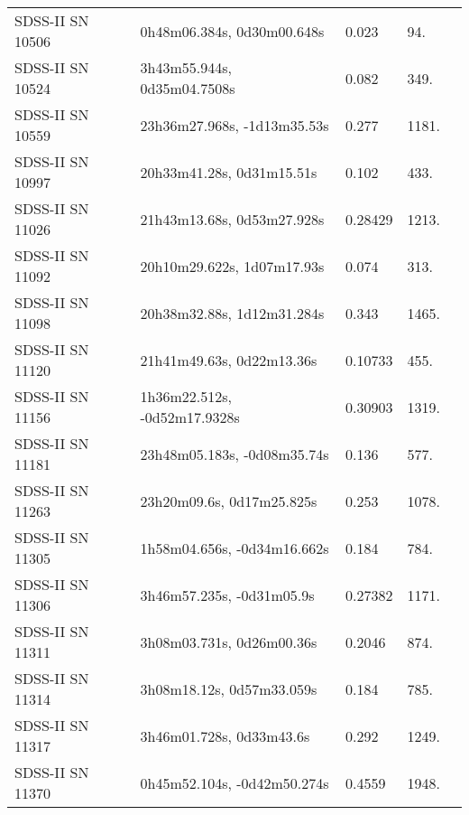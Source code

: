 \begin{longtable}{lllll}
 SDSS-II SN 10506 &     0h48m06.384s, 0d30m00.648s &    0.023 &            94. &    \citet{2011ApJ...738..162S} \\
 SDSS-II SN 10524 &    3h43m55.944s, 0d35m04.7508s &    0.082 &           349. &    \citet{2011ApJ...738..162S} \\
 SDSS-II SN 10559 &    23h36m27.968s, -1d13m35.53s &    0.277 &          1181. &    \citet{2011ApJ...738..162S} \\
 SDSS-II SN 10997 &      20h33m41.28s, 0d31m15.51s &    0.102 &           433. &    \citet{2011ApJ...738..162S} \\
 SDSS-II SN 11026 &     21h43m13.68s, 0d53m27.928s &  0.28429 &          1213. &    \citet{2016SDSSD.C...0000:} \\
 SDSS-II SN 11092 &     20h10m29.622s, 1d07m17.93s &    0.074 &           313. &    \citet{2011ApJ...738..162S} \\
 SDSS-II SN 11098 &     20h38m32.88s, 1d12m31.284s &    0.343 &          1465. &    \citet{2011ApJ...738..162S} \\
 SDSS-II SN 11120 &      21h41m49.63s, 0d22m13.36s &  0.10733 &           455. &    \citet{2016SDSSD.C...0000:} \\
 SDSS-II SN 11156 &   1h36m22.512s, -0d52m17.9328s &  0.30903 &          1319. &    \citet{2016SDSSD.C...0000:} \\
 SDSS-II SN 11181 &    23h48m05.183s, -0d08m35.74s &    0.136 &           577. &    \citet{2011ApJ...738..162S} \\
 SDSS-II SN 11263 &      23h20m09.6s, 0d17m25.825s &    0.253 &          1078. &    \citet{2005ApJS..158..161H} \\
 SDSS-II SN 11305 &    1h58m04.656s, -0d34m16.662s &    0.184 &           784. &    \citet{2011ApJ...738..162S} \\
 SDSS-II SN 11306 &      3h46m57.235s, -0d31m05.9s &  0.27382 &          1171. &    \citet{2016SDSSD.C...0000:} \\
 SDSS-II SN 11311 &      3h08m03.731s, 0d26m00.36s &   0.2046 &           874. &    \citet{2011ApJ...738..162S} \\
 SDSS-II SN 11314 &      3h08m18.12s, 0d57m33.059s &    0.184 &           785. &    \citet{2011ApJ...738..162S} \\
 SDSS-II SN 11317 &       3h46m01.728s, 0d33m43.6s &    0.292 &          1249. &    \citet{2011ApJ...738..162S} \\
 SDSS-II SN 11370 &    0h45m52.104s, -0d42m50.274s &   0.4559 &          1948. &    \citet{2006MNRAS.372..425C} \\

\end{longtable}

